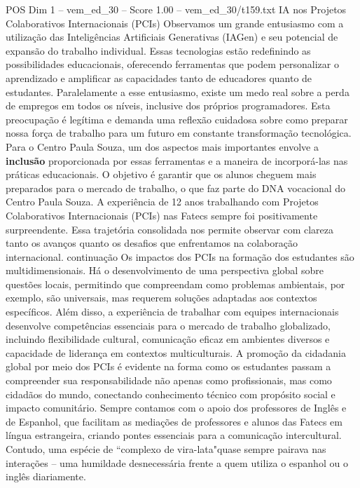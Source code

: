 \begin{textsample}{POS Dim 1 – vem\_ed\_30 – Score 1.00 – vem\_ed\_30/t159.txt}  \label{ex:f1_pos_061}
IA nos Projetos Colaborativos Internacionais (PCIs) Observamos um grande entusiasmo com a utilização das Inteligências Artificiais Generativas (IAGen) e seu potencial de expansão do trabalho individual.
Essas tecnologias estão redefinindo as possibilidades educacionais, oferecendo ferramentas que podem personalizar o aprendizado e amplificar as capacidades tanto de educadores quanto de estudantes.
Paralelamente a esse entusiasmo, existe um medo real sobre a perda de empregos em todos os níveis, inclusive dos próprios programadores.
Esta preocupação é legítima e demanda uma reflexão cuidadosa sobre como preparar nossa força de trabalho para um futuro em constante transformação tecnológica.
Para o Centro Paula Souza, um dos aspectos mais importantes envolve a \textbf{inclusão} proporcionada por essas ferramentas e a maneira de incorporá-las nas práticas educacionais.
O objetivo é garantir que os alunos cheguem mais preparados para o mercado de trabalho, o que faz parte do DNA vocacional do Centro Paula Souza.
A experiência de 12 anos trabalhando com Projetos Colaborativos Internacionais (PCIs) nas Fatecs sempre foi positivamente surpreendente.
Essa trajetória consolidada nos permite observar com clareza tanto os avanços quanto os desafios que enfrentamos na colaboração internacional. continuação Os impactos dos PCIs na formação dos estudantes são multidimensionais.
Há o desenvolvimento de uma perspectiva global sobre questões locais, permitindo que compreendam como problemas ambientais, por exemplo, são universais, mas requerem soluções adaptadas aos contextos específicos.
Além disso, a experiência de trabalhar com equipes internacionais desenvolve competências essenciais para o mercado de trabalho globalizado, incluindo flexibilidade cultural, comunicação eficaz em ambientes diversos e capacidade de liderança em contextos multiculturais.
A promoção da cidadania global por meio dos PCIs é evidente na forma como os estudantes passam a compreender sua responsabilidade não apenas como profissionais, mas como cidadãos do mundo, conectando conhecimento técnico com propósito social e impacto comunitário.
Sempre contamos com o apoio dos professores de Inglês e de Espanhol, que facilitam as mediações de professores e alunos das Fatecs em língua estrangeira, criando pontes essenciais para a comunicação intercultural.
Contudo, uma espécie de “complexo de vira-lata"quase sempre pairava nas interações – uma humildade desnecessária frente a quem utiliza o espanhol ou o inglês diariamente.

\end{textsample}
